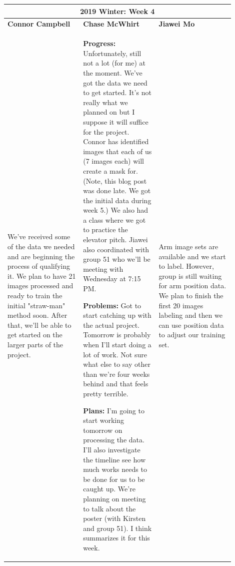\documentclass[10pt,journal,compsoc, draftclsnofoot,onecolumn]{IEEEtran}
\begin{document}
\begin{center}
\begin{tabular}{|p{0.3\linewidth}|p{0.3\linewidth}|p{0.3\linewidth}|}
\hline
\multicolumn{3}{|c|}{\textbf{2019 Winter: Week 4}} \\
\hline
\textbf{Connor Campbell} & \textbf{Chase McWhirt} & \textbf{Jiawei Mo} \\ [0.5ex]
\hline\hline

We've received some of the data we needed and are beginning the process of qualifying it. We plan to have 21 images processed and ready to train the initial "straw-man" method soon. After that, we'll be able to get started on the larger parts of the project.
&
\textbf{Progress:} Unfortunately, still not a lot (for me) at the moment.
We've got the data we need to get started.
It's not really what we planned on but I suppose it will suffice for the project.
Connor has identified images that each of us (7 images each) will create a mask for.
(Note, this blog post was done late. We got the initial data during week 5.)
We also had a class where we got to practice the elevator pitch.
Jiawei also coordinated with group 51 who we'll be meeting with Wednesday at 7:15 PM.

\textbf{Problems:} Got to start catching up with the actual project.
Tomorrow is probably when I'll start doing a lot of work.
Not sure what else to say other than we're four weeks behind and that feels pretty terrible.

\textbf{Plans:} I'm going to start working tomorrow on processing the data.
I'll also investigate the timeline see how much works needs to be done for us to be caught up.
We're planning on meeting to talk about the poster (with Kirsten and group 51).
I think summarizes it for this week.
&
Arm image sets are available and we start to label. However, group is still waiting for arm position data. We plan to finish the first 20 images labeling and then we can use position data to adjust our training set.
\\ \hline
\end{tabular}
\end{center}
\end{document}

